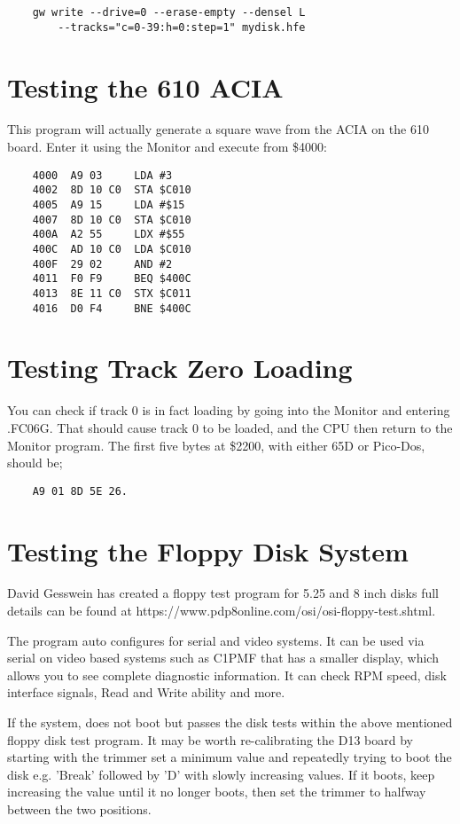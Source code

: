 \begin{verbatim}
    gw write --drive=0 --erase-empty --densel L 
        --tracks="c=0-39:h=0:step=1" mydisk.hfe
\end{verbatim}

\section{Testing the 610 ACIA}

This program will actually generate a square wave from the ACIA on the 610 board. Enter it using the Monitor and execute from \$4000:

\begin{verbatim}
    4000  A9 03     LDA #3
    4002  8D 10 C0  STA $C010
    4005  A9 15     LDA #$15
    4007  8D 10 C0  STA $C010
    400A  A2 55     LDX #$55
    400C  AD 10 C0  LDA $C010
    400F  29 02     AND #2
    4011  F0 F9     BEQ $400C
    4013  8E 11 C0  STX $C011
    4016  D0 F4     BNE $400C
\end{verbatim}

\section{Testing Track Zero Loading}

You can check if track 0 is in fact loading by going into the Monitor and entering .FC06G. That should cause track 0 to be loaded, and the CPU then return to the Monitor program. The first five bytes at \$2200, with either 65D or Pico-Dos, should be;

\begin{verbatim}
    A9 01 8D 5E 26.
\end{verbatim}

\section{Testing the Floppy Disk System}

David Gesswein has created a floppy test program for 5.25 and 8 inch disks full details can be found at https://www.pdp8online.com/osi/osi-floppy-test.shtml.

The program auto configures for serial and video systems. It can be used via serial on video based systems such as C1PMF that has a smaller display, which allows you to see complete diagnostic information. It can check RPM speed, disk interface signals, Read and Write ability and more.

If the system, does not boot but passes the disk tests within the above mentioned floppy disk test program. It may be worth re-calibrating the D13 board by starting with the trimmer set a minimum value and repeatedly trying to boot the disk e.g. 'Break' followed by 'D' with slowly increasing values. If it boots, keep increasing the value until it no longer boots, then set the trimmer to halfway between the two positions.

